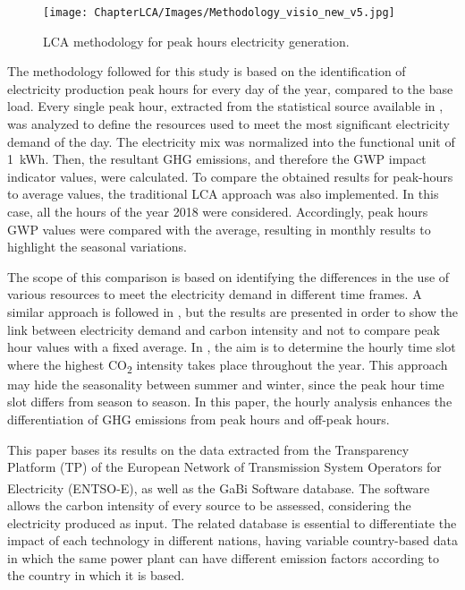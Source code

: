 {\begin{figure}[htbp]
	\centering
	\texttt{[image: ChapterLCA/Images/Methodology\_visio\_new\_v5.jpg]}
		\caption{LCA methodology for peak hours electricity generation.}%
	\label{Methodology}
\end{figure}


The methodology followed for this study is based on the identification of electricity production peak hours for every day of the year, compared to the base load. Every single peak hour, extracted from the statistical source available in \cite{ENTSOE_TP}, was analyzed to define the resources used to meet the most significant electricity demand of the day. The electricity mix was normalized into the functional unit of 1~kWh. Then, the resultant GHG emissions, and therefore the GWP impact indicator values, were calculated. To compare the obtained results for peak-hours to average values, the traditional LCA approach was also implemented. In this case, all the hours of the year 2018 were considered. Accordingly, peak hours GWP values were compared with the average, resulting in monthly results to highlight the seasonal variations. 

{The scope of this comparison is based on identifying the differences in the use of various resources to meet the electricity demand in different time frames}.  A similar approach is followed in \cite{Khan2018, Khan2018AnalysisIntensity, Cubi2015IncorporationAssessment}, but the results are presented in order to show the link between electricity demand and carbon intensity and not to compare peak hour values with a fixed average. In \cite{Nilsson2017AssessingEmissions}, the aim is to determine the hourly time slot where the highest CO\textsubscript2 intensity takes place throughout the year. This approach may hide the seasonality between summer and winter, since the peak hour time slot differs from season to season. In this paper, the hourly analysis enhances the differentiation of GHG emissions from peak hours and off-peak hours. 

This paper bases its results on the data extracted from the Transparency Platform (TP) of the European Network of Transmission System Operators for Electricity (ENTSO-E), as well as the GaBi\textsuperscript{\textregistered} Software database. {The software allows the carbon intensity of every source to be assessed, considering the electricity produced as input. The related database is essential to differentiate the impact of each technology in different nations, having variable country-based data in which the same power plant can have different emission factors according to the country in which it is based}.
 
}

